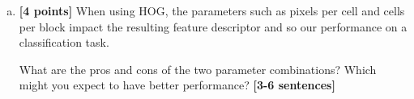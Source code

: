 \begin{enumerate}[(a)]
\begin{enumerate}[(i)]
\begin{enumerate}[1.]
\end{enumerate}
\end{enumerate}

\item \textbf{[4 points]}
When using HOG, the parameters such as pixels per cell and cells per block impact the resulting feature descriptor and so our performance on a classification task.

\begin{tcolorbox}[colback=orange!5!white,colframe=orange!75!black]
    What are the pros and cons of the two parameter combinations? Which might you expect to have better performance? \textbf{[3-6 sentences]}
\end{tcolorbox}


\end{enumerate}









